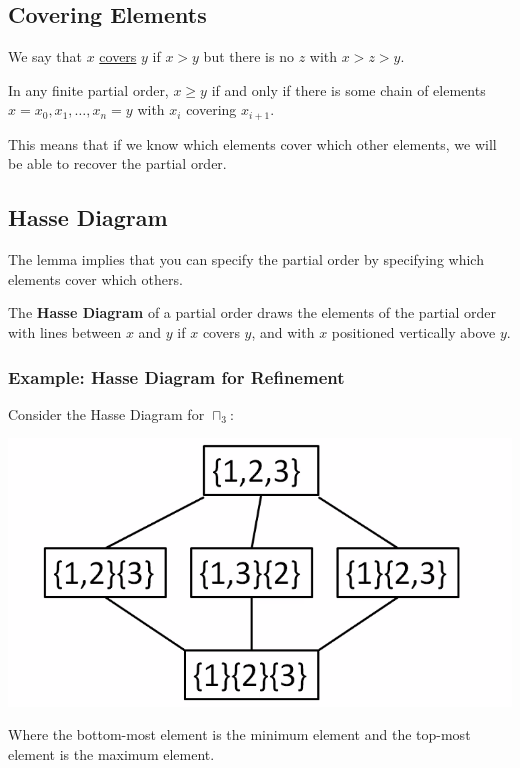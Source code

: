 \documentclass[letterpaper]{article}
\begin{document}
\subsection{Covering Elements}
\begin{definition}{}{}
    We say that $x$ \underline{covers} $y$ if $x > y$ but there is no $z$ with $x > z > y$. 
\end{definition}

\begin{lemma}{}{}
    In any finite partial order, $x \geq y$ if and only if there is some chain of elements $x = x_0, x_1, \dots, x_n = y$ with $x_i$ covering $x_{i + 1}$. 
\end{lemma}
This means that if we know which elements cover which other elements, we will be able to recover the partial order. 


\subsection{Hasse Diagram}
The lemma implies that you can specify the partial order by specifying which elements cover which others. 

\begin{definition}{}{}
    The \textbf{Hasse Diagram} of a partial order draws the elements of the partial order with lines between $x$ and $y$ if $x$ covers $y$, and with $x$ positioned vertically above $y$.
\end{definition}

\subsubsection{Example: Hasse Diagram for Refinement}
Consider the Hasse Diagram for $\sqcap_3$:
\begin{center}
    \includegraphics[scale=0.5]{img/ex_hasse.PNG}
\end{center}
Where the bottom-most element is the minimum element and the top-most element is the maximum element. 
\end{document}
